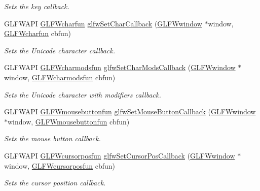 \begin{DoxyCompactItemize}
\begin{DoxyCompactList}\small\item\em Sets the key callback. \end{DoxyCompactList}\item 
G\+L\+F\+W\+A\+P\+I \hyperlink{group__input_gabf24451c7ceb1952bc02b17a0d5c3e5f}{G\+L\+F\+Wcharfun} \hyperlink{group__input_ga07b2959b23dc3e466ce7475746021002}{glfw\+Set\+Char\+Callback} (\hyperlink{group__window_ga3c96d80d363e67d13a41b5d1821f3242}{G\+L\+F\+Wwindow} $\ast$window, \hyperlink{group__input_gabf24451c7ceb1952bc02b17a0d5c3e5f}{G\+L\+F\+Wcharfun} cbfun)
\begin{DoxyCompactList}\small\item\em Sets the Unicode character callback. \end{DoxyCompactList}\item 
G\+L\+F\+W\+A\+P\+I \hyperlink{group__input_gae36fb6897d2b7df9b128900c8ce9c507}{G\+L\+F\+Wcharmodsfun} \hyperlink{group__input_gae6eee0bda7429bfe8028615847cf6795}{glfw\+Set\+Char\+Mods\+Callback} (\hyperlink{group__window_ga3c96d80d363e67d13a41b5d1821f3242}{G\+L\+F\+Wwindow} $\ast$window, \hyperlink{group__input_gae36fb6897d2b7df9b128900c8ce9c507}{G\+L\+F\+Wcharmodsfun} cbfun)
\begin{DoxyCompactList}\small\item\em Sets the Unicode character with modifiers callback. \end{DoxyCompactList}\item 
G\+L\+F\+W\+A\+P\+I \hyperlink{group__input_ga39893a4a7e7c3239c98d29c9e084350c}{G\+L\+F\+Wmousebuttonfun} \hyperlink{group__input_ga20e5ba1ce4e086aedd48a06dc311c95f}{glfw\+Set\+Mouse\+Button\+Callback} (\hyperlink{group__window_ga3c96d80d363e67d13a41b5d1821f3242}{G\+L\+F\+Wwindow} $\ast$window, \hyperlink{group__input_ga39893a4a7e7c3239c98d29c9e084350c}{G\+L\+F\+Wmousebuttonfun} cbfun)
\begin{DoxyCompactList}\small\item\em Sets the mouse button callback. \end{DoxyCompactList}\item 
G\+L\+F\+W\+A\+P\+I \hyperlink{group__input_ga4cfad918fa836f09541e7b9acd36686c}{G\+L\+F\+Wcursorposfun} \hyperlink{group__input_ga9c49c0d3d3c775c3124726f1d902124d}{glfw\+Set\+Cursor\+Pos\+Callback} (\hyperlink{group__window_ga3c96d80d363e67d13a41b5d1821f3242}{G\+L\+F\+Wwindow} $\ast$window, \hyperlink{group__input_ga4cfad918fa836f09541e7b9acd36686c}{G\+L\+F\+Wcursorposfun} cbfun)
\begin{DoxyCompactList}\small\item\em Sets the cursor position callback. \end{DoxyCompactList}\item 

\end{DoxyCompactItemize}
